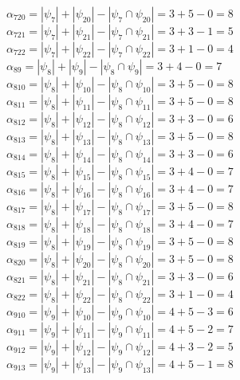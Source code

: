 \documentclass[a4paper,12pt]{article}
\begin{document}
$\alpha_{720} = |\psi_{7}| + |\psi_{20}| - |\psi_{7} \cap \psi_{20}| = 3 + 5 - 0 = 8$\\
$\alpha_{721} = |\psi_{7}| + |\psi_{21}| - |\psi_{7} \cap \psi_{21}| = 3 + 3 - 1 = 5$\\
$\alpha_{722} = |\psi_{7}| + |\psi_{22}| - |\psi_{7} \cap \psi_{22}| = 3 + 1 - 0 = 4$\\
$\alpha_{89} = |\psi_{8}| + |\psi_{9}| - |\psi_{8} \cap \psi_{9}| = 3 + 4 - 0 = 7$\\
$\alpha_{810} = |\psi_{8}| + |\psi_{10}| - |\psi_{8} \cap \psi_{10}| = 3 + 5 - 0 = 8$\\
$\alpha_{811} = |\psi_{8}| + |\psi_{11}| - |\psi_{8} \cap \psi_{11}| = 3 + 5 - 0 = 8$\\
$\alpha_{812} = |\psi_{8}| + |\psi_{12}| - |\psi_{8} \cap \psi_{12}| = 3 + 3 - 0 = 6$\\
$\alpha_{813} = |\psi_{8}| + |\psi_{13}| - |\psi_{8} \cap \psi_{13}| = 3 + 5 - 0 = 8$\\
$\alpha_{814} = |\psi_{8}| + |\psi_{14}| - |\psi_{8} \cap \psi_{14}| = 3 + 3 - 0 = 6$\\
$\alpha_{815} = |\psi_{8}| + |\psi_{15}| - |\psi_{8} \cap \psi_{15}| = 3 + 4 - 0 = 7$\\
$\alpha_{816} = |\psi_{8}| + |\psi_{16}| - |\psi_{8} \cap \psi_{16}| = 3 + 4 - 0 = 7$\\
$\alpha_{817} = |\psi_{8}| + |\psi_{17}| - |\psi_{8} \cap \psi_{17}| = 3 + 5 - 0 = 8$\\
$\alpha_{818} = |\psi_{8}| + |\psi_{18}| - |\psi_{8} \cap \psi_{18}| = 3 + 4 - 0 = 7$\\
$\alpha_{819} = |\psi_{8}| + |\psi_{19}| - |\psi_{8} \cap \psi_{19}| = 3 + 5 - 0 = 8$\\
$\alpha_{820} = |\psi_{8}| + |\psi_{20}| - |\psi_{8} \cap \psi_{20}| = 3 + 5 - 0 = 8$\\
$\alpha_{821} = |\psi_{8}| + |\psi_{21}| - |\psi_{8} \cap \psi_{21}| = 3 + 3 - 0 = 6$\\
$\alpha_{822} = |\psi_{8}| + |\psi_{22}| - |\psi_{8} \cap \psi_{22}| = 3 + 1 - 0 = 4$\\
$\alpha_{910} = |\psi_{9}| + |\psi_{10}| - |\psi_{9} \cap \psi_{10}| = 4 + 5 - 3 = 6$\\
$\alpha_{911} = |\psi_{9}| + |\psi_{11}| - |\psi_{9} \cap \psi_{11}| = 4 + 5 - 2 = 7$\\
$\alpha_{912} = |\psi_{9}| + |\psi_{12}| - |\psi_{9} \cap \psi_{12}| = 4 + 3 - 2 = 5$\\
$\alpha_{913} = |\psi_{9}| + |\psi_{13}| - |\psi_{9} \cap \psi_{13}| = 4 + 5 - 1 = 8$\\
\end{document}
